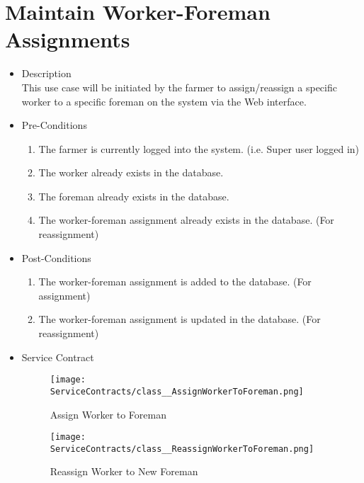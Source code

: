 \documentclass[11pt,fleqn]{book} %
\begin{document}
\section{Maintain Worker-Foreman Assignments}
\begin{itemize}
	\item Description\\
	This use case will be initiated by the farmer to assign/reassign a specific worker to a specific foreman on the system via the Web interface.
	\item Pre-Conditions
	\begin{enumerate}
		\item The farmer is currently logged into the system. (i.e. Super user logged in)
		\item The worker already exists in the database. 
		\item The foreman already exists in the database.
		\item The worker-foreman assignment already exists in the database. (For reassignment)				
	\end{enumerate}
	\item Post-Conditions
	\begin{enumerate}
		\item The worker-foreman assignment is added to the database. (For assignment)
		\item The worker-foreman assignment is updated in the database. (For reassignment)		
	\end{enumerate}
	\item Service Contract
	\begin{figure}
		\texttt{[image: ServiceContracts/class\_\_AssignWorkerToForeman.png]}
		\caption{Assign Worker to Foreman}
	\end{figure}
	\begin{figure}
		\texttt{[image: ServiceContracts/class\_\_ReassignWorkerToForeman.png]}
		\caption{Reassign Worker to New Foreman}
	\end{figure}
\end{itemize}
\end{document}
